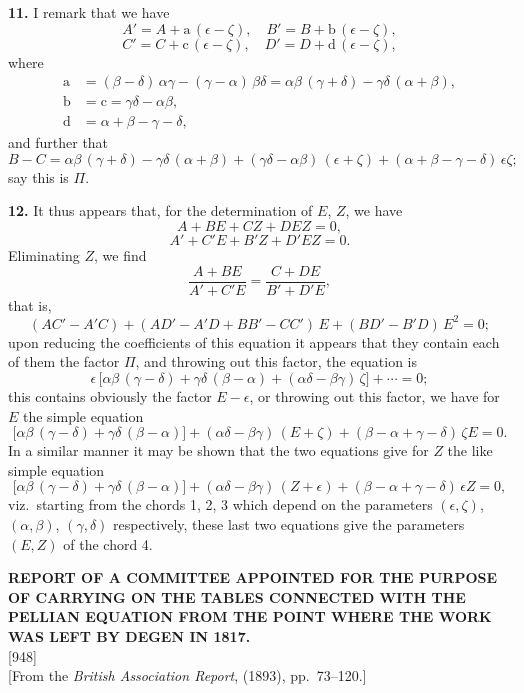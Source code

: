 \documentclass[11pt]{article}
\newcommand{\paper}[3]{%
  \clearpage
  \begin{center}
    {\large\bfseries #2}\\[0.5em]
    {\small [#1]}\\[0.3em]
    {\small #3}
  \end{center}
  \vspace{0.5em}
}
\begin{document}
\medskip
\noindent\textbf{11.} I remark that we have
\[
A' = A + \mathrm{a}\,(\epsilon - \zeta), \quad B' = B + \mathrm{b}\,(\epsilon - \zeta),
\]
\[
C' = C + \mathrm{c}\,(\epsilon - \zeta), \quad D' = D + \mathrm{d}\,(\epsilon - \zeta),
\]
where
\[
\begin{aligned}
\mathrm{a} &= (\beta - \delta)\,\alpha\gamma - (\gamma - \alpha)\,\beta\delta = \alpha\beta\,(\gamma + \delta) - \gamma\delta\,(\alpha + \beta), \\
\mathrm{b} &= \mathrm{c} = \gamma\delta - \alpha\beta, \\
\mathrm{d} &= \alpha + \beta - \gamma - \delta,
\end{aligned}
\]
and further that
\[
B - C = \alpha\beta\,(\gamma + \delta) - \gamma\delta\,(\alpha + \beta) + (\gamma\delta - \alpha\beta)\,(\epsilon + \zeta) + (\alpha + \beta - \gamma - \delta)\,\epsilon\zeta;
\]
say this is $\Pi$.

\medskip
\noindent\textbf{12.} It thus appears that, for the determination of $E$, $Z$, we have
\[
A + BE + CZ + DEZ = 0,
\]
\[
A' + C'E + B'Z + D'EZ = 0.
\]
Eliminating $Z$, we find
\[
\frac{A + BE}{A' + C'E} = \frac{C + DE}{B' + D'E},
\]
that is,
\[
(AC' - A'C) + (AD' - A'D + BB' - CC')\,E + (BD' - B'D)\,E^2 = 0;
\]
upon reducing the coefficients of this equation it appears that they contain each of them the factor $\Pi$, and throwing out this factor, the equation is
\[
\epsilon\,\bigl[\alpha\beta\,(\gamma - \delta) + \gamma\delta\,(\beta - \alpha) + (\alpha\delta - \beta\gamma)\,\zeta\bigr] + \cdots = 0;
\]
this contains obviously the factor $E - \epsilon$, or throwing out this factor, we have for $E$ the simple equation
\[
\bigl[\alpha\beta\,(\gamma - \delta) + \gamma\delta\,(\beta - \alpha)\bigr] + (\alpha\delta - \beta\gamma)\,(E + \zeta) + (\beta - \alpha + \gamma - \delta)\,\zeta E = 0.
\]
In a similar manner it may be shown that the two equations give for $Z$ the like simple equation
\[
\bigl[\alpha\beta\,(\gamma - \delta) + \gamma\delta\,(\beta - \alpha)\bigr] + (\alpha\delta - \beta\gamma)\,(Z + \epsilon) + (\beta - \alpha + \gamma - \delta)\,\epsilon Z = 0,
\]
viz.\ starting from the chords 1, 2, 3 which depend on the parameters $(\epsilon, \zeta)$, $(\alpha, \beta)$, $(\gamma, \delta)$ respectively, these last two equations give the parameters $(E, Z)$ of the chord 4.

\paper{948}{REPORT OF A COMMITTEE APPOINTED FOR THE PURPOSE OF CARRYING ON THE TABLES CONNECTED WITH THE PELLIAN EQUATION FROM THE POINT WHERE THE WORK WAS LEFT BY DEGEN IN 1817.}{[From the \textit{British Association Report}, (1893), pp.\ 73--120.]}
\end{document}

